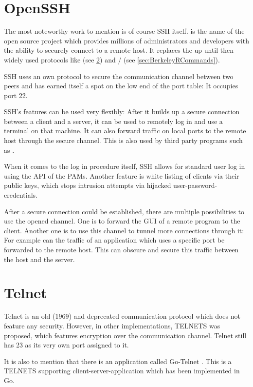\documentclass[10pt,a4paper,titlepage,twoside,english,final]{zhawreprt}
\begin{document}
\section{OpenSSH}\label{sec:OpenSSH}
The most noteworthy work to mention is of course \gls{SSH} itself.
\cite{openssh} is the name of the open source project which provides millions of administrators and developers with the ability to securely connect to a remote host.
It replaces the up until then widely used protocols like \cite{telnet} (see \ref{sec:Telnet}) and \cite{rlogin}/\cite{rsh} (see \ref{sec:BerkeleyRCommands}).

\gls{SSH} uses an own protocol to secure the communication channel between two peers and has earned itself a spot on the low end of the \gls{port} table:
It occupies \gls{port} 22.

\gls{SSH}'s features can be used very flexibly:
After it builds up a secure connection between a client and a server, it can be used to remotely log in and use a \gls{terminal} on that machine.
It can also forward traffic on local ports to the remote host through the secure channel.
This is also used by third party programs such as \cite{rsync}.

When it comes to the log in procedure itself, \gls{SSH} allows for standard user log in using the \gls{API} of the \glspl{PAM}.
Another feature is white listing of clients via their public keys, which stops intrusion attempts via hijacked user-password-credentials.

After a secure connection could be established, there are multiple possibilities to use the opened channel.
One is to forward the \gls{GUI} of a remote program to the client.
Another one is to use this channel to tunnel more connections through it:
For example can the traffic of an application which uses a specific \gls{port} be forwarded to the remote host.
This can obscure and secure this traffic between the host and the server.

\section{Telnet}\label{sec:Telnet}
Telnet \citep{rfc15,rfc854} is an old (1969) and deprecated communication protocol which does not feature any security.
However, in other implementations, \gls{TELNETS} was proposed, which features encryption over the communication channel.
Telnet still has 23 as its very own \gls{port} assigned to it.

It is also to mention that there is an application called Go-Telnet \citep{gotelnet}.
This is a \gls{TELNETS} supporting client-server-application which has been implemented in \gls{Go}.
\end{document}
